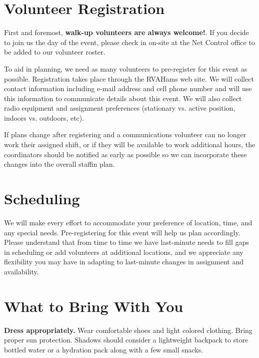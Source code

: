 \documentclass[pdflatex,letterpaper,twoside,12pt]{book}
\begin{document}
\section{Volunteer Registration}

First and foremost, \textbf{walk-up volunteers are always welcome!}.  If you decide to join us the day of the event, please check in on-site at the Net Control office to be added to our volunteer roster.

To aid in planning, we need as many volunteers to pre-register for this event as possible.  Registration takes place through the RVAHams web site.  We will collect contact information including e-mail address and cell phone number and will use this information to communicate details about this event.  We will also collect radio equipment and assignment preferences (stationary vs. active position, indoors vs. outdoors, etc).

If plans change after registering and a communications volunteer can no longer work their assigned shift, or if they will be available to work additional hours, the coordinators should be notified as early as possible so we can incorporate these changes into the overall staffin plan.


\section{Scheduling}

We will make every effort to accommodate your preference of location, time, and any special needs.  Pre-registering for this event will help us plan accordingly.  Please understand that from time to time we have last-minute needs to fill gaps in scheduling or add volunteers at additional locations, and we appreciate any flexibility you may have in adapting to last-minute changes in assignment and availability.


\section{What to Bring With You}

\textbf{Dress appropriately.}  Wear comfortable shoes and light colored clothing.  Bring proper sun protection.  Shadows should consider a lightweight backpack to store bottled water or a hydration pack along with a few small snacks.
\end{document}

